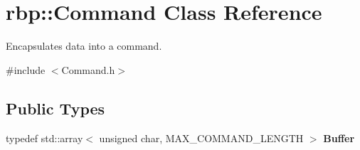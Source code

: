 \hypertarget{classrbp_1_1Command}{}\section{rbp\+:\+:Command Class Reference}
\label{classrbp_1_1Command}


Encapsulates data into a command.  




{\ttfamily \#include $<$Command.\+h$>$}

\subsection*{Public Types}
\begin{DoxyCompactItemize}
\item 
\hypertarget{classrbp_1_1Command_aac0655813a2cc70a11b6410a9356a1ff}{}typedef std\+::array$<$ unsigned char, M\+A\+X\+\_\+\+C\+O\+M\+M\+A\+N\+D\+\_\+\+L\+E\+N\+G\+T\+H $>$ {\bfseries Buffer}\label{classrbp_1_1Command_aac0655813a2cc70a11b6410a9356a1ff}

\end{DoxyCompactItemize}
